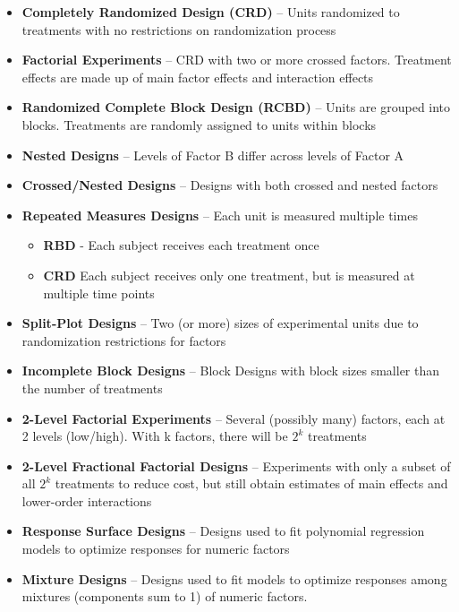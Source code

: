 \documentclass[
]{book}
\providecommand{\tightlist}{%
  \setlength{\itemsep}{0pt}\setlength{\parskip}{0pt}}
\begin{document}
\begin{itemize}
\tightlist
\item
  \textbf{Completely Randomized Design (CRD)} -- Units randomized to
  treatments with no restrictions on randomization process
\item
  \textbf{Factorial Experiments} -- CRD with two or more crossed
  factors. Treatment effects are made up of main factor effects and
  interaction effects
\item
  \textbf{Randomized Complete Block Design (RCBD)} -- Units are grouped
  into blocks. Treatments are randomly assigned to units within blocks
\item
  \textbf{Nested Designs} -- Levels of Factor B differ across levels of
  Factor A
\item
  \textbf{Crossed/Nested Designs} -- Designs with both crossed and
  nested factors
\item
  \textbf{Repeated Measures Designs} -- Each unit is measured multiple
  times

  \begin{itemize}
  \tightlist
  \item
    \textbf{RBD} - Each subject receives each treatment once
  \item
    \textbf{CRD} Each subject receives only one treatment, but is
    measured at multiple time points
  \end{itemize}
\item
  \textbf{Split-Plot Designs} -- Two (or more) sizes of experimental
  units due to randomization restrictions for factors
\item
  \textbf{Incomplete Block Designs} -- Block Designs with block sizes
  smaller than the number of treatments
\item
  \textbf{2-Level Factorial Experiments} -- Several (possibly many)
  factors, each at 2 levels (low/high). With k factors, there will be
  \(2^k\) treatments
\item
  \textbf{2-Level Fractional Factorial Designs} -- Experiments with only
  a subset of all \(2^k\) treatments to reduce cost, but still obtain
  estimates of main effects and lower-order interactions
\item
  \textbf{Response Surface Designs} -- Designs used to fit polynomial
  regression models to optimize responses for numeric factors
\item
  \textbf{Mixture Designs} -- Designs used to fit models to optimize
  responses among mixtures (components sum to 1) of numeric factors.
\end{itemize}
\end{document}
